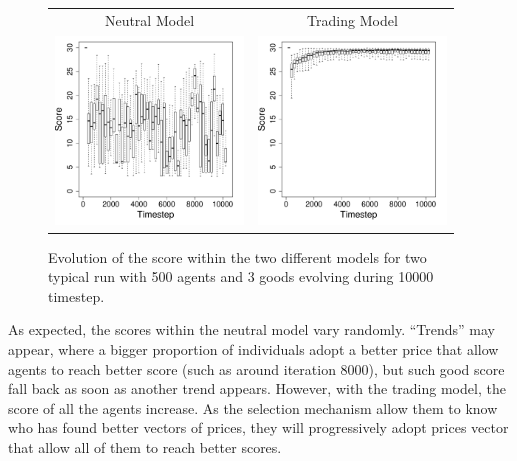 \documentclass{wscpaperproc}
\begin{document}
\begin{figure}[h]
	\centering
	\begin{tabular}{ c c}
		 Neutral Model & Trading Model \\
		 \includegraphics[width=5cm]{img/ScoreEvolutionForRandom-G3N500.pdf}
		 & \includegraphics[width=5cm]{img/ScoreEvolutionForTrade-G3N500.pdf}

	\end{tabular}
	\caption{Evolution of the score within the two different models for two typical run with 500 agents and 3 goods evolving during 10000 timestep.}%
	\label{fig:scoreEvol}
\end{figure}


As expected, the scores within the neutral model vary randomly. ``Trends'' may appear, where a bigger proportion of individuals adopt a better price that allow agents to reach better score (such as around iteration 8000), but such good score fall back as soon as another trend appears. However, with the trading model, the score of all the agents increase. As the selection mechanism allow them to know who has found better vectors of prices, they will progressively adopt prices vector that allow all of them to reach better scores. 
\end{document}
